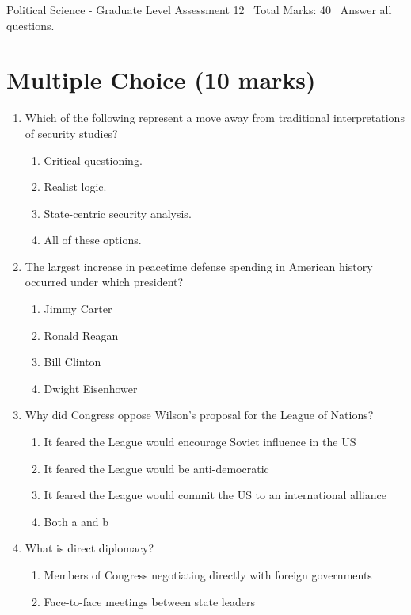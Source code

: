 \documentclass[12pt]{article}
\begin{document}
\begin{center}
Political Science - Graduate Level Assessment 12 \
Total Marks: 40 \
Answer all questions.
\end{center}

\section*{Multiple Choice (10 marks)}
\begin{enumerate}[label=\arabic*.]
\item Which of the following represent a move away from traditional interpretations of security studies?
\begin{enumerate}[label=(\alph*)]
    \item Critical questioning.
    \item Realist logic.
    \item State-centric security analysis.
    \item All of these options.
\end{enumerate}
\item The largest increase in peacetime defense spending in American history occurred under which president?
\begin{enumerate}[label=(\alph*)]
    \item Jimmy Carter
    \item Ronald Reagan
    \item Bill Clinton
    \item Dwight Eisenhower
\end{enumerate}
\item Why did Congress oppose Wilson's proposal for the League of Nations?
\begin{enumerate}[label=(\alph*)]
    \item It feared the League would encourage Soviet influence in the US
    \item It feared the League would be anti-democratic
    \item It feared the League would commit the US to an international alliance
    \item Both a and b
\end{enumerate}
\item What is direct diplomacy?
\begin{enumerate}[label=(\alph*)]
    \item Members of Congress negotiating directly with foreign governments
    \item Face-to-face meetings between state leaders

\end{enumerate}
\end{enumerate}
\end{document}

